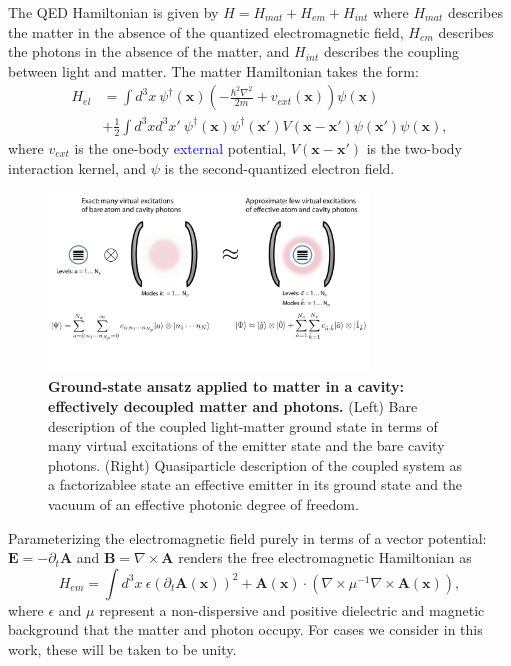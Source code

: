 \documentclass[aps,prl,twocolumn,
	groupedaddress,superscriptaddress,
	amsfonts,amssymb,amsmath,floatfix,
	citeautoscript]{revtex4-1}
\newcommand{\Jadd}[1]{\textcolor{blue}{#1}}
\begin{document}
The QED Hamiltonian is given by $H = H_{mat}+H_{em}+H_{int}$ where $H_{mat}$ describes the matter in the absence of the quantized electromagnetic field, $H_{em}$ describes the photons in the absence of the matter, and $H_{int}$ describes the coupling between light and matter. The matter Hamiltonian takes the form:
\begin{align}
H_{el} &= \int d^3x ~\psi^{\dagger}(\mathbf{x})\left(-\frac{\hbar^2\nabla^2}{2m} + v_{ext}(\mathbf{x}) \right)\psi(\mathbf{x}) \nonumber \\ &+ \frac{1}{2}\int d^3x d^3x'~ \psi^{\dagger}(\mathbf{x})\psi^{\dagger}(\mathbf{x}')V(\mathbf{x}-\mathbf{x}')\psi(\mathbf{x}')\psi(\mathbf{x}),
\end{align}
where $v_{ext}$ is the one-body \Jadd{external} potential, $V(\mathbf{x}-\mathbf{x}')$ is the two-body interaction kernel, and $\psi$ is the second-quantized electron field. %
\begin{figure}[t]
\includegraphics[width=8.5cm]{conceptfigure.pdf}
\caption{\textbf{Ground-state ansatz applied to matter in a cavity: effectively decoupled matter and photons.} (Left) Bare description of the coupled light-matter ground state in terms of many virtual excitations of the emitter state and the bare cavity photons. (Right) Quasiparticle description of the coupled system as a factorizablee state an effective emitter in its ground state and the vacuum of an effective photonic degree of freedom.}
\label{fig:ansatz}
\end{figure}
Parameterizing the electromagnetic field purely in terms of a vector potential: $\mathbf{E} = -\partial_t\mathbf{A}$ and $\mathbf{B} = \nabla\times\mathbf{A}$ renders the free electromagnetic Hamiltonian as
\begin{equation}
H_{em} = \int d^3x~ \epsilon (\partial_t \mathbf{A}(\mathbf{x}))^2 + \mathbf{A}(\mathbf{x})\cdot(\nabla\times\mu^{-1}\nabla\times\mathbf{A}(\mathbf{x})),
\end{equation}
where $\epsilon$ and $\mu$ represent a non-dispersive and positive dielectric and magnetic background that the matter and photon occupy. For cases we consider in this work, these will be taken to be unity.
\end{document}
